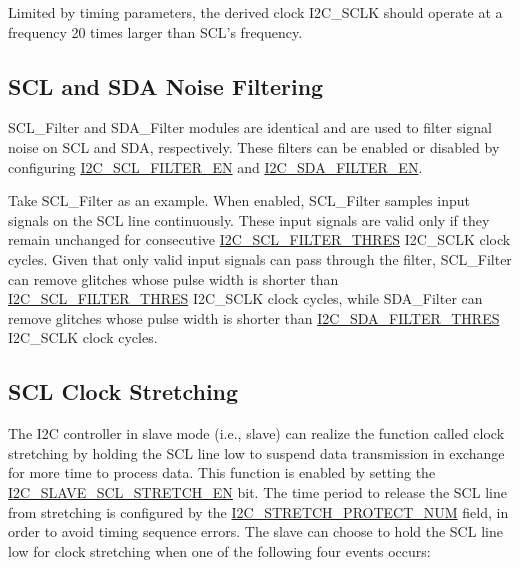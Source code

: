 \documentclass[main\_\_EN.tex]{subfiles}
\begin{document}
Limited by timing parameters, the derived clock I2C\_SCLK should operate at a frequency 20 times larger than SCL's frequency.


\subsection{SCL and SDA Noise Filtering}
SCL\_Filter and SDA\_Filter modules are identical and are used to filter signal noise on SCL and SDA, respectively. These filters can be enabled or disabled by configuring \hyperref[fielddesc:I2CSCLFILTEREN]{I2C\_SCL\_FILTER\_EN} and \hyperref[fielddesc:I2CSDAFILTEREN]{I2C\_SDA\_FILTER\_EN}.

Take SCL\_Filter as an example. When enabled, SCL\_Filter samples input signals on the SCL line continuously. These input signals are valid only if they remain unchanged for consecutive \hyperref[fielddesc:I2CSCLFILTERTHRES]{I2C\_SCL\_FILTER\_THRES} I2C\_SCLK clock cycles. Given that only valid input signals can pass through the filter, SCL\_Filter can remove glitches whose pulse width is shorter than \hyperref[fielddesc:I2CSCLFILTERTHRES]{I2C\_SCL\_FILTER\_THRES} I2C\_SCLK clock cycles, while SDA\_Filter can remove glitches whose pulse width is shorter than \hyperref[fielddesc:I2CSDAFILTERTHRES]{I2C\_SDA\_FILTER\_THRES} I2C\_SCLK clock cycles.


\subsection{SCL Clock Stretching}
The I2C controller in slave mode (i.e., slave) can realize the function called clock stretching by holding the SCL line low to suspend data transmission in exchange for more time to process data. This function is enabled by setting the \hyperref[fielddesc:I2CSLAVESCLSTRETCHEN]{I2C\_SLAVE\_SCL\_STRETCH\_EN} bit. The time period to release the SCL line from stretching is configured by the \hyperref[fielddesc:I2CSTRETCHPROTECTNUM]{I2C\_STRETCH\_PROTECT\_NUM} field, in order to avoid timing sequence errors.
The slave can choose to hold the SCL line low for clock stretching when one of the following four events occurs:
\end{document}
